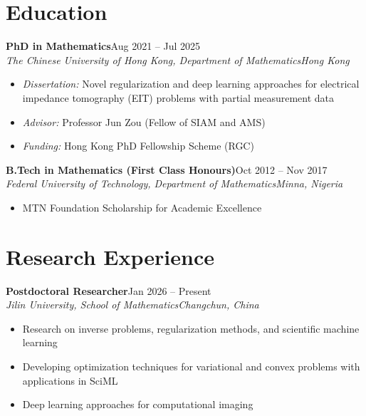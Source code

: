 \documentclass[11pt,a4paper]{article}
\newenvironment{cventry}[4]{%
    \par\noindent\begin{minipage}{\linewidth}%
    \noindent\textbf{#1}\hfill #2\\
    \textit{#3}\hfill\textit{#4}\par\vspace{2pt}%
}{%
    \end{minipage}\par
}
\begin{document}
\section{Education}

\begin{cventry}{PhD in Mathematics}{Aug 2021 -- Jul 2025}{The Chinese University of Hong Kong, Department of Mathematics}{Hong Kong}
\begin{itemize}[nosep, leftmargin=1.5em]
    \item \textit{Dissertation:} Novel regularization and deep learning approaches for electrical impedance tomography (EIT) problems with partial measurement data
    \item \textit{Advisor:} Professor Jun Zou (Fellow of SIAM and AMS)
    \item \textit{Funding:} Hong Kong PhD Fellowship Scheme (RGC)
\end{itemize}
\end{cventry}
\vspace{6pt}

\begin{cventry}{B.Tech in Mathematics (First Class Honours)}{Oct 2012 -- Nov 2017}{Federal University of Technology, Department of Mathematics}{Minna, Nigeria}
\begin{itemize}[nosep, leftmargin=1.5em]
    \item MTN Foundation Scholarship for Academic Excellence
\end{itemize}
\end{cventry}

\section{Research Experience}

\begin{cventry}{Postdoctoral Researcher}{Jan 2026 -- Present}{Jilin University, School of Mathematics}{Changchun, China}
\begin{itemize}[nosep, leftmargin=1.5em]
    \item Research on inverse problems, regularization methods, and scientific machine learning
    \item Developing optimization techniques for variational and convex problems with applications in SciML
    \item Deep learning approaches for computational imaging
\end{itemize}
\end{cventry}
\vspace{6pt}
\end{document}
